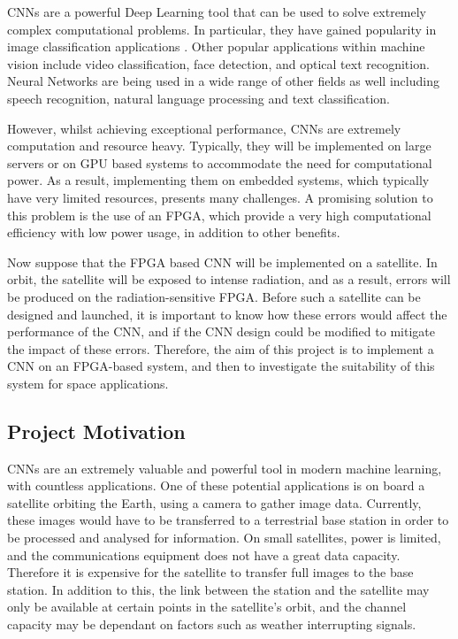 \documentclass[12pt]{article}
\begin{document}
CNNs are a powerful Deep Learning tool that can be used to solve extremely complex computational problems. In particular, they have gained popularity in image classification applications \cite{ImageNetChallenge}. Other popular applications within machine vision include video classification, face detection, and optical text recognition. Neural Networks are being used in a wide range of other fields as well including speech recognition, natural language processing and text classification.

However, whilst achieving exceptional performance, CNNs are extremely computation and resource heavy. Typically, they will be implemented on large servers or on GPU based systems to accommodate the need for computational power. As a result, implementing them on embedded systems, which typically have very limited resources, presents many challenges. A promising solution to this problem is the use of an FPGA, which provide a very high computational efficiency with low power usage, in addition to other benefits.

Now suppose that the FPGA based CNN will be implemented on a satellite. In orbit, the satellite will be exposed to intense radiation, and as a result, errors will be produced on the radiation-sensitive FPGA. Before such a satellite can be designed and launched, it is important to know how these errors would affect the performance of the CNN, and if the CNN design could be modified to mitigate the impact of these errors. Therefore, the aim of this project is to implement a CNN on an FPGA-based system, and then to investigate the suitability of this system for space applications.

\subsection{Project Motivation}
\label{sec:Intro-ProjectMotivation}

CNNs are an extremely valuable and powerful tool in modern machine learning, with countless applications. One of these potential applications is on board a satellite orbiting the Earth, using a camera to gather image data. Currently, these images would have to be transferred to a terrestrial base station in order to be processed and analysed for information. On small satellites, power is limited, and the communications equipment does not have a great data capacity. Therefore it is expensive for the satellite to transfer full images to the base station. In addition to this, the link between the station and the satellite may only be available at certain points in the satellite’s orbit, and the channel capacity may be dependant on factors such as weather interrupting signals. 
\end{document}
